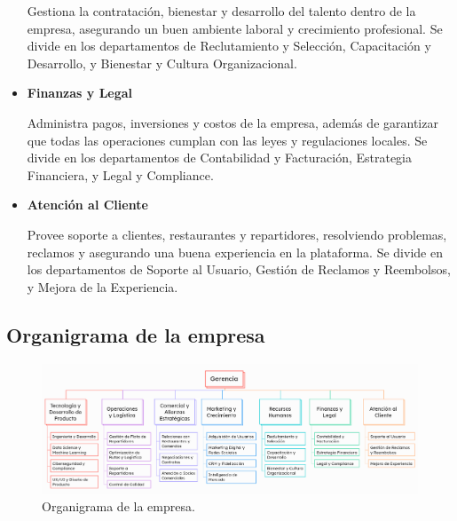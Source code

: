 \begin{itemize}
    Gestiona la contratación, bienestar y desarrollo del talento dentro de la empresa, asegurando un buen ambiente laboral y crecimiento profesional. Se divide en los departamentos de Reclutamiento y Selección, Capacitación y Desarrollo, y Bienestar y Cultura Organizacional.

    \item \textbf{Finanzas y Legal} \nopagebreak
    
    Administra pagos, inversiones y costos de la empresa, además de garantizar que todas las operaciones cumplan con las leyes y regulaciones locales. Se divide en los departamentos de Contabilidad y Facturación, Estrategia Financiera, y Legal y Compliance.

    \item \textbf{Atención al Cliente} \nopagebreak
    
    Provee soporte a clientes, restaurantes y repartidores, resolviendo problemas, reclamos y asegurando una buena experiencia en la plataforma. Se divide en los departamentos de Soporte al Usuario, Gestión de Reclamos y Reembolsos, y Mejora de la Experiencia.
\end{itemize}

\subsection{Organigrama de la empresa}
\begin{figure}[H]
    \centering
    \includegraphics[width=\textwidth]{./img/organigrama.png}
    \caption{Organigrama de la empresa.}
\end{figure}